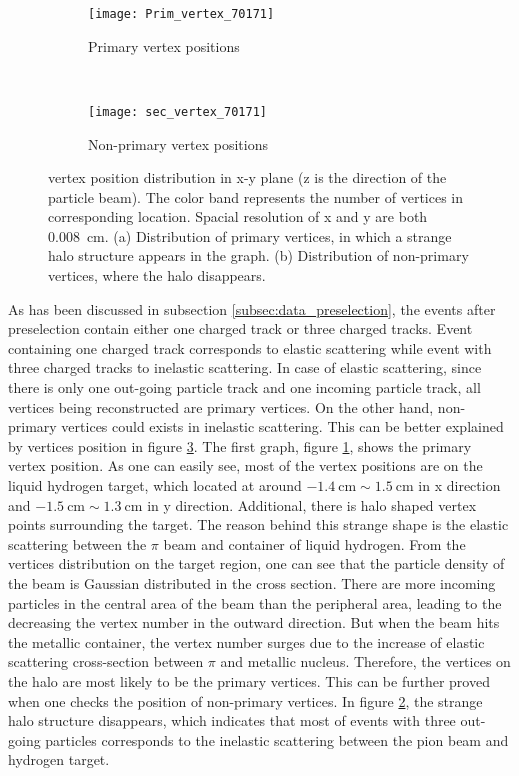 \begin{figure}[!b]
	\centering
	\begin{subfigure}[t]{0.5\textwidth}
		\texttt{[image: Prim\_vertex\_70171]}
		\caption{Primary vertex positions}
		\label{fig:Prim_vertex_70171}
	\end{subfigure}
	~ %
	\begin{subfigure}[b]{0.5\textwidth}
		\texttt{[image: sec\_vertex\_70171]}
		\caption{Non-primary vertex positions}
		\label{fig:sec_vertex_70171}
	\end{subfigure}
	\caption{vertex position distribution in x-y plane (z is the direction of the particle beam). The color band represents the number of vertices in corresponding location. Spacial resolution of x and y are both \SI{0.008}{\centi\meter}. (a) Distribution of primary vertices, in which a strange halo structure appears in the graph. (b) Distribution of non-primary vertices, where the halo disappears.}
	\label{fig:ver_pos}
\end{figure}

As has been discussed in subsection \ref{subsec:data_preselection}, the events after preselection contain either one charged track or three charged tracks. Event containing one charged track corresponds to elastic scattering while event with three charged tracks to inelastic scattering. In case of elastic scattering, since there is only one out-going particle track and one incoming particle track, all vertices being reconstructed are primary vertices. On the other hand, non-primary vertices could exists in inelastic scattering. This can be better explained by vertices position in figure \ref{fig:ver_pos}. The first graph, figure \ref{fig:Prim_vertex_70171}, shows the primary vertex position. As one can easily see, most of the vertex positions are on the liquid hydrogen target, which located at around $\SI{-1.4}{\centi\meter} \sim \SI{1.5}{\centi\meter}$ in x direction and $\SI{-1.5}{\centi\meter} \sim \SI{1.3}{\centi\meter}$ in y direction. Additional, there is halo shaped vertex points surrounding the target. The reason behind this strange shape is the elastic scattering between the $\pi$ beam and container of liquid hydrogen. From the vertices distribution on the target region, one can see that the particle density of the beam is Gaussian distributed in the cross section. There are more incoming particles in the central area of the beam than the peripheral area, leading to the decreasing the vertex number in the outward direction. But when the beam hits the metallic container, the vertex number surges due to the increase of elastic scattering cross-section between $\pi$ and metallic nucleus. Therefore, the vertices on the halo are most likely to be the primary vertices. This can be further proved when one checks the position of non-primary vertices. In figure \ref{fig:sec_vertex_70171}, the strange halo structure disappears, which indicates that most of events with three out-going particles corresponds to the inelastic scattering between the pion beam and hydrogen target.  


